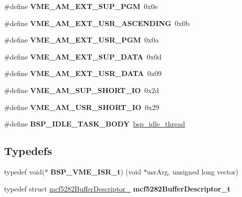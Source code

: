 \begin{DoxyCompactItemize}
\#define {\bfseries V\+M\+E\+\_\+\+A\+M\+\_\+\+E\+X\+T\+\_\+\+S\+U\+P\+\_\+\+P\+GM}~0x0e
\item 
\mbox{\label{group__RTEMSBSPsM68kUC5282_ga8cf9349a33f3232bb0c5c722879d382c}} 
\#define {\bfseries V\+M\+E\+\_\+\+A\+M\+\_\+\+E\+X\+T\+\_\+\+U\+S\+R\+\_\+\+A\+S\+C\+E\+N\+D\+I\+NG}~0x0b
\item 
\mbox{\label{group__RTEMSBSPsM68kUC5282_ga8bdb2b4347983044ea6809c3cee6c14b}} 
\#define {\bfseries V\+M\+E\+\_\+\+A\+M\+\_\+\+E\+X\+T\+\_\+\+U\+S\+R\+\_\+\+P\+GM}~0x0a
\item 
\mbox{\label{group__RTEMSBSPsM68kUC5282_gabc8b5caa4acb903262beac166c973647}} 
\#define {\bfseries V\+M\+E\+\_\+\+A\+M\+\_\+\+E\+X\+T\+\_\+\+S\+U\+P\+\_\+\+D\+A\+TA}~0x0d
\item 
\mbox{\label{group__RTEMSBSPsM68kUC5282_ga4b34f3b7068dac1648d2d0970c76c7fb}} 
\#define {\bfseries V\+M\+E\+\_\+\+A\+M\+\_\+\+E\+X\+T\+\_\+\+U\+S\+R\+\_\+\+D\+A\+TA}~0x09
\item 
\mbox{\label{group__RTEMSBSPsM68kUC5282_ga0928dce71e0eaddaedf34c446b618e26}} 
\#define {\bfseries V\+M\+E\+\_\+\+A\+M\+\_\+\+S\+U\+P\+\_\+\+S\+H\+O\+R\+T\+\_\+\+IO}~0x2d
\item 
\mbox{\label{group__RTEMSBSPsM68kUC5282_gae108e52e94a5632d214ecc55bd4e89a8}} 
\#define {\bfseries V\+M\+E\+\_\+\+A\+M\+\_\+\+U\+S\+R\+\_\+\+S\+H\+O\+R\+T\+\_\+\+IO}~0x29
\item 
\mbox{\label{group__RTEMSBSPsM68kUC5282_ga4aa606d0badadcc28e8054cb60f13b56}} 
\#define {\bfseries B\+S\+P\+\_\+\+I\+D\+L\+E\+\_\+\+T\+A\+S\+K\+\_\+\+B\+O\+DY}~\mbox{\hyperlink{group__RTEMSBSPsSPARCLEON3_ga301be7085b80c41a9c5887247003c662}{bsp\+\_\+idle\+\_\+thread}}
\end{DoxyCompactItemize}
\subsection*{Typedefs}
\begin{DoxyCompactItemize}
\item 
\mbox{\label{group__RTEMSBSPsM68kUC5282_gab777c767c2e96fa81e77557b43597adf}} 
typedef void($\ast$ {\bfseries B\+S\+P\+\_\+\+V\+M\+E\+\_\+\+I\+S\+R\+\_\+t}) (void $\ast$usr\+Arg, unsigned long vector)
\item 
\mbox{\label{group__RTEMSBSPsM68kUC5282_ga7ce08266bf5bbd680ecd0f9f3deae97a}} 
typedef struct \mbox{\hyperlink{structmcf5282BufferDescriptor__}{mcf5282\+Buffer\+Descriptor\+\_\+}} {\bfseries mcf5282\+Buffer\+Descriptor\+\_\+t}
\end{DoxyCompactItemize}
